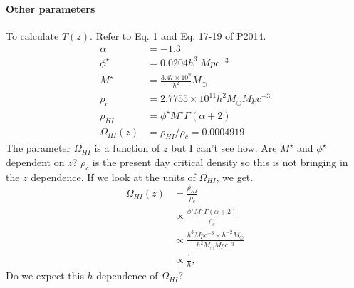 \documentclass[12pt]{article}
\numberwithin{equation}{section}
\begin{document}
\paragraph{Other parameters}
To calculate $ \bar{T}(z) $. Refer to Eq. 1 and Eq. 17-19 of P2014.
\begin{align*}
\alpha &= -1.3\\
\phi^\star &= 0.0204 h^3 \; Mpc^{-3} \\
M^\star &= \frac{3.47\times10^9}{h^2}M_\odot \\
\rho_c &= 2.7755 \times 10^{11} h^2 M_\odot Mpc^{-3}\\
\rho_{HI} &= \phi^\star M^\star \Gamma(\alpha + 2)  \\
\Omega_{HI}(z) &= \rho_{HI}/\rho_c = 0.0004919
\end{align*}
The parameter $ \Omega_{HI} $ is a function of $ z $ but I can't see how. Are $ M^\star $ and $ \phi^\star $ dependent on $ z $? $ \rho_c $ is the present day critical density so this is not bringing in the $ z $ dependence. If we look at the units of $ \Omega_{HI} $, we get.
\begin{align}
\Omega_{HI}(z) &= \frac{\rho_{HI}}{\rho_c} \\
&\propto \frac{\phi^\star M^\star \Gamma(\alpha + 2)}{\rho_c}\\
&\propto \frac{h^3 Mpc^{-3} \times h^{-2}M_\odot}{h^2 M_\odot Mpc^{-3}}\\
&\propto \frac{1}{h},
\end{align}
Do we expect this $ h $ dependence of $ \Omega_{HI} $?
\end{document}
